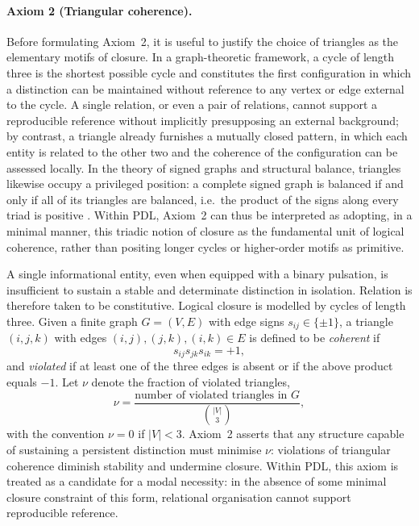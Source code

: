 \documentclass[11pt,a4paper]{article}
\begin{document}
\paragraph{Axiom 2 (Triangular coherence).}
Before formulating Axiom~2, it is useful to justify the choice of triangles as the elementary motifs of closure. In a graph-theoretic framework, a cycle of length three is the shortest possible cycle and constitutes the first configuration in which a distinction can be maintained without reference to any vertex or edge external to the cycle. A single relation, or even a pair of relations, cannot support a reproducible reference without implicitly presupposing an external background; by contrast, a triangle already furnishes a mutually closed pattern, in which each entity is related to the other two and the coherence of the configuration can be assessed locally. In the theory of signed graphs and structural balance, triangles likewise occupy a privileged position: a complete signed graph is balanced if and only if all of its triangles are balanced, i.e.\ the product of the signs along every triad is positive \cite{Harary_balance,Cartwright_Harary}. Within PDL, Axiom~2 can thus be interpreted as adopting, in a minimal manner, this triadic notion of closure as the fundamental unit of logical coherence, rather than positing longer cycles or higher-order motifs as primitive.

A single informational entity, even when equipped with a binary pulsation, is insufficient to sustain a stable and determinate distinction in isolation. Relation is therefore taken to be constitutive. Logical closure is modelled by cycles of length three. Given a finite graph \(G = (V,E)\) with edge signs \(s_{ij} \in \{\pm 1\}\), a triangle \((i,j,k)\) with edges \((i,j), (j,k), (i,k) \in E\) is defined to be \emph{coherent} if
\[
s_{ij} s_{jk} s_{ik} = +1,
\]
and \emph{violated} if at least one of the three edges is absent or if the above product equals \(-1\). Let \(\nu\) denote the fraction of violated triangles,
\[
\nu = \frac{\text{number of violated triangles in } G}{\binom{|V|}{3}},
\]
with the convention \(\nu = 0\) if \(|V| < 3\). Axiom~2 asserts that any structure capable of sustaining a persistent distinction must minimise \(\nu\): violations of triangular coherence diminish stability and undermine closure. Within PDL, this axiom is treated as a candidate for a modal necessity: in the absence of some minimal closure constraint of this form, relational organisation cannot support reproducible reference.
\end{document}
